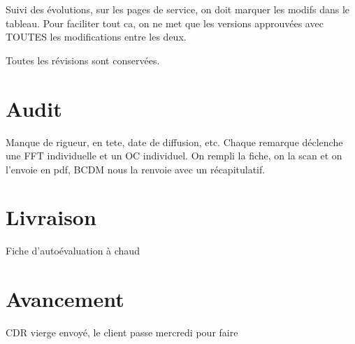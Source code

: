 \documentclass [a4paper] {article}
\begin{document}
Suivi des évolutions, sur les pages de service, on doit marquer les modifs dans le tableau. Pour faciliter tout ca, on ne met que les versions approuvées avec TOUTES les modifications entre les deux.

Toutes les révisions sont conservées.


\section{Audit}
Manque de rigueur, en tete, date de diffusion, etc. 
Chaque remarque déclenche une FFT individuelle et un OC individuel.
On rempli la fiche, on la scan et on l'envoie en pdf, BCDM nous la renvoie avec un récapitulatif.


\section{Livraison}
Fiche d'autoévaluation à chaud


\section{Avancement}
CDR vierge envoyé, le client passe mercredi pour faire
\end{document}
